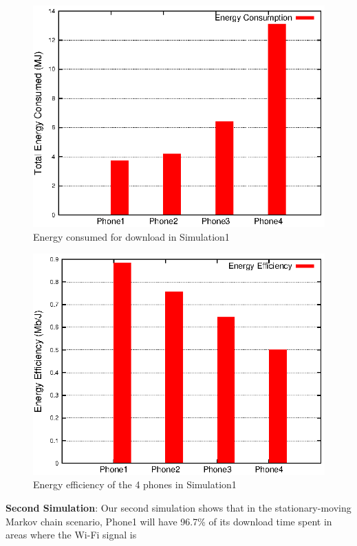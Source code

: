 \documentclass[journal]{IEEEtran}
\begin{document}
\begin{figure}
\centering
\includegraphics[scale=0.85]{result_directional_energy.eps}
\caption{Energy consumed for download in Simulation1}
\end{figure}
\begin{figure}
\centering
\includegraphics[scale=0.85]{result_directional_efficiency.eps}
\caption{Energy efficiency of the 4 phones in Simulation1}
\end{figure}
{\bf Second Simulation}: 
Our second simulation shows that in the stationary-moving Markov chain scenario, Phone1 will have 96.7\% of its download time spent in areas where the Wi-Fi signal is 
\end{document}
